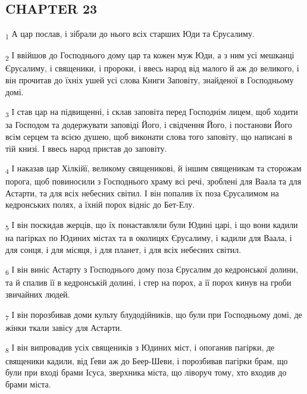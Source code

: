 \subsection{CHAPTER 23}
\begin{tcolorbox}
\textsubscript{1} А цар послав, і зібрали до нього всіх старших Юди та Єрусалиму.
\end{tcolorbox}
\begin{tcolorbox}
\textsubscript{2} І ввійшов до Господнього дому цар та кожен муж Юди, а з ним усі мешканці Єрусалиму, і священики, і пророки, і ввесь народ від малого й аж до великого, і він прочитав до їхніх ушей усі слова Книги Заповіту, знайденої в Господньому домі.
\end{tcolorbox}
\begin{tcolorbox}
\textsubscript{3} І став цар на підвищенні, і склав заповіта перед Господнім лицем, щоб ходити за Господом та додержувати заповіді Його, і свідчення Його, і постанови Його всім серцем та всією душею, щоб виконати слова того заповіту, що написані в тій книзі. І ввесь народ пристав до заповіту.
\end{tcolorbox}
\begin{tcolorbox}
\textsubscript{4} І наказав цар Хілкійї, великому священикові, й іншим священикам та сторожам порога, щоб повиносили з Господнього храму всі речі, зроблені для Ваала та для Астарти, та для всіх небесних світил. І він попалив їх поза Єрусалимом на кедронських полях, а їхній порох відніс до Бет-Елу.
\end{tcolorbox}
\begin{tcolorbox}
\textsubscript{5} І він поскидав жерців, що їх понаставляли були Юдині царі, і що вони кадили на пагірках по Юдиних містах та в околицях Єрусалиму, і кадили для Ваала, і для сонця, і для місяця, і для планет, і для всіх небесних світил.
\end{tcolorbox}
\begin{tcolorbox}
\textsubscript{6} І він виніс Астарту з Господнього дому поза Єрусалим до кедронської долини, та й спалив її в кедронській долині, і стер на порох, а її порох кинув на гроби звичайних людей.
\end{tcolorbox}
\begin{tcolorbox}
\textsubscript{7} І він порозбивав доми культу блудодійників, що були при Господньому домі, де жінки ткали завісу для Астарти.
\end{tcolorbox}
\begin{tcolorbox}
\textsubscript{8} І він випровадив усіх священиків з Юдиних міст, і опоганив пагірки, де священики кадили, від Ґеви аж до Беер-Шеви, і порозбивав пагірки брам, що були при вході брами Ісуса, зверхника міста, що ліворуч тому, хто входив до брами міста.
\end{tcolorbox}
